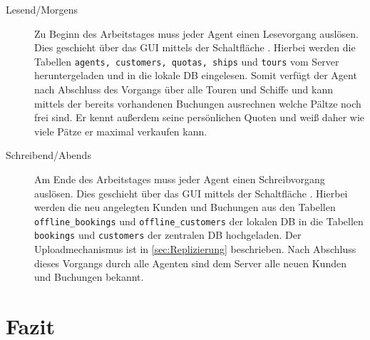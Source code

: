 \documentclass[12pt,a4paper,ngerman,english]{report}
\begin{document}
\begin{description}
\item[Lesend/Morgens] Zu Beginn des Arbeitstages muss jeder Agent einen Lesevorgang auslösen. Dies geschieht über das GUI mittels der Schaltfläche . Hierbei werden die Tabellen \texttt{agents, customers, quotas, ships} und \texttt{tours} vom Server heruntergeladen und in die lokale DB eingelesen. Somit verfügt der Agent nach Abschluss des Vorgangs über alle Touren und Schiffe und kann mittels der bereits vorhandenen Buchungen ausrechnen welche Pältze noch frei sind. Er kennt außerdem seine persönlichen Quoten und weiß daher wie viele Pätze er maximal verkaufen kann.
\item[Schreibend/Abends] Am Ende des Arbeitstages muss jeder Agent einen Schreibvorgang auslösen. Dies geschieht über das GUI mittels der Schaltfläche . Hierbei werden die neu angelegten Kunden und Buchungen aus den Tabellen \texttt{offline\_bookings} und \texttt{offline\_customers} der lokalen DB in die Tabellen \texttt{bookings} und \texttt{customers} der zentralen DB hochgeladen. Der Uploadmechanismus ist in \autoref{sec:Replizierung} beschrieben. Nach Abschluss dieses Vorgangs durch alle Agenten sind dem Server alle neuen Kunden und Buchungen bekannt. 
\end{description}

\chapter{Fazit}


{}

\end{document}
